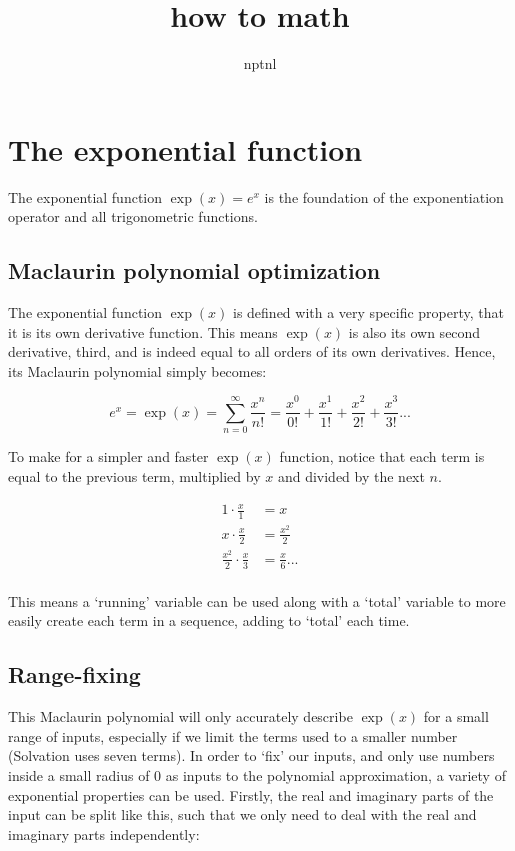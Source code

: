 \documentclass[10pt]{article}
\title{how to math}
\author{nptnl}
\begin{document}
\maketitle

\section{The exponential function}

The exponential function $\exp(x) = e^x$ is the foundation of the exponentiation operator and all trigonometric functions.

\subsection{Maclaurin polynomial optimization}

The exponential function $\exp(x)$ is defined with a very specific property, that it is its own derivative function. This means $\exp(x)$ is also its own second derivative, third, and is indeed equal to all orders of its own derivatives. Hence, its Maclaurin polynomial simply becomes:

\[
    e^x = \exp(x) = ∑_{n=0}^∞ \frac{x^n}{n!} = \frac{x^0}{0!} + \frac{x^1}{1!} + \frac{x^2}{2!} + \frac{x^3}{3!} ...
\]

To make for a simpler and faster $\exp(x)$ function, notice that each term is equal to the previous term, multiplied by $x$ and divided by the next $n$.

\begin{align*}
    1 · \frac{x}{1} &= x \\
    x · \frac{x}{2} &= \frac{x^2}{2} \\
    \frac{x^2}{2} · \frac{x}{3} &= \frac{x}{6} ... \\
\end{align*}

This means a `running' variable can be used along with a `total' variable to more easily create each term in a sequence, adding to `total' each time.

\subsection{Range-fixing}

This Maclaurin polynomial will only accurately describe $\exp(x)$ for a small range of inputs, especially if we limit the terms used to a smaller number (Solvation uses seven terms). In order to `fix' our inputs, and only use numbers inside a small radius of 0 as inputs to the polynomial approximation, a variety of exponential properties can be used. Firstly, the real and imaginary parts of the input can be split like this, such that we only need to deal with the real and imaginary parts independently:
\end{document}
